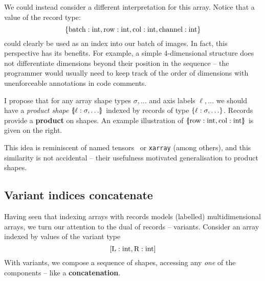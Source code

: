 We could instead consider a different interpretation for this array. Notice that a value of the record type:
$$ \srecordtype{ \mathrm{batch}: \sint, \mathrm{row}: \sint, \mathrm{col}: \sint, \mathrm{channel}: \sint } $$
could clearly be used as an index into our batch of images. In fact, this perspective has its benefits. For example, a simple 4-dimensional structure does not differentiate dimensions beyond their position in the sequence -- the programmer would usually need to keep track of the order of dimensions with \eg{} unenforceable annotations in code comments. 

\begin{wrapfigure}[6]{r}{2.5cm}
\vspace{-0.8cm}
\begin{center}
\end{center}
\end{wrapfigure}

I propose that for any array shape types $\sigma, \dots$ and axis labels $\ell, \dots$ we should have a \textit{product shape} $\sproducttype{\ell : \sigma, \dots}$ indexed by records of type $\srecordtype{\ell : \sigma, \dots}$.
Records provide a \textbf{product} on shapes. 
An example illustration of $\sproducttype{\mathrm{row}: \sint, \mathrm{col}: \sint}$ is given on the right.

This idea is reminiscent of named tensors~\cite{named-tensors} or \texttt{xarray} \cite{hoyer2017xarray} (among others), and this similarity is not accidental -- their usefulness motivated generalisation to product shapes.

\subsection{Variant indices concatenate}

Having seen that indexing arrays with records models (labelled) multidimensional arrays, we turn our attention to the dual of records -- variants. 
Consider an array
indexed by values of the variant type
$$\svarianttype{\mathrm{L} : \sint, \mathrm{R} : \sint}$$
With variants, we compose a sequence of shapes, accessing any \textit{one} of the components -- like a \textbf{concatenation}. 

